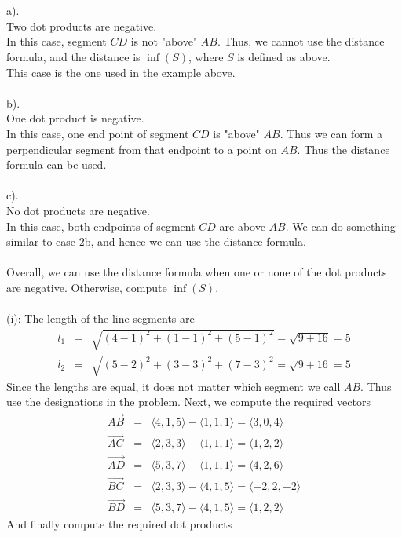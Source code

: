 \documentclass[12pt]{amsbook}
\newcommand{\la}{\langle}
\newcommand{\ra}{\rangle}
\begin{document}
\\
\\
a).
\\
Two dot products are negative.
\\
In this case, segment $CD$ is not "above" $AB$. Thus, we cannot use the distance formula, and the distance is $\inf (S)$, where $S$ is defined as above.
\\
This case is the one used in the example above.
\\
\\
b).
\\
One dot product is negative.
\\
In this case, one end point of segment $CD$ is "above" $AB$. Thus we can form a perpendicular segment from that endpoint to a point on $AB$. Thus the distance formula can be used.
\\
\\
c).
\\
No dot products are negative.
\\
In this case, both endpoints of segment $CD$ are above $AB$. We can do something similar to case 2b, and hence we can use the distance formula.
\\
\\
Overall, we can use the distance formula when one or none of the dot products are negative. Otherwise, compute $\inf(S)$.
\\
\\
(i): The length of the line segments are 
\begin{eqnarray*}
l_1&=&\sqrt{(4-1)^2+(1-1)^2+(5-1)^2}=\sqrt{9+16}=5\\
l_2&=&\sqrt{(5-2)^2+(3-3)^2+(7-3)^2}=\sqrt{9+16}=5
\end{eqnarray*}
Since the lengths are equal, it does not matter which segment we call $AB$. Thus use the designations in the problem. Next, we compute the required vectors
\begin{eqnarray*}
\overrightarrow{AB}&=&\la 4,1,5 \ra - \la 1,1,1 \ra =\la 3,0,4 \ra \\
\overrightarrow{AC}&=&\la 2,3,3 \ra - \la 1,1,1 \ra =\la 1,2,2 \ra \\
\overrightarrow{AD}&=&\la 5,3,7 \ra - \la 1,1,1 \ra =\la 4,2,6 \ra \\
\overrightarrow{BC}&=&\la 2,3,3 \ra - \la 4,1,5 \ra =\la -2,2,-2 \ra \\
\overrightarrow{BD}&=&\la 5,3,7 \ra - \la 4,1,5 \ra =\la 1,2,2 \ra 
\end{eqnarray*}
And finally compute the required dot products
\end{document}
